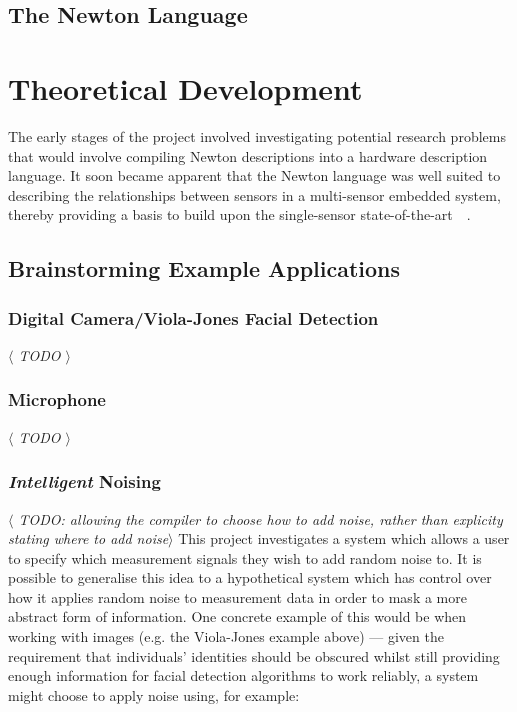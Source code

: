 \documentclass[12pt]{article}
\begin{document}
  \subsection{The Newton Language}


\newpage



%
%

\section{Theoretical Development}
  The early stages of the project involved investigating potential research problems that would involve compiling Newton descriptions into a hardware description language. It soon became apparent that the Newton language was well suited to describing the relationships between sensors in a multi-sensor embedded system, thereby providing a basis to build upon the single-sensor state-of-the-art~\cite{Choi2018GuaranteeingLD}~\cite{diffpriv_2006}.
  \subsection{Brainstorming Example Applications}
    \subsubsection{Digital Camera/Viola-Jones Facial Detection}
      \textit{$\langle$ TODO $\rangle$}

    \subsubsection{Microphone}
      \textit{$\langle$ TODO $\rangle$}

    \subsubsection{\textit{Intelligent} Noising}
      \textit{$\langle$ TODO: allowing the compiler to choose how to add noise, rather than explicity stating where to add noise$\rangle$}
      This project investigates a system which allows a user to specify which measurement signals they wish to add random noise to. It is possible to generalise this idea to a hypothetical system which has control over how it applies random noise to measurement data in order to mask a more abstract form of information. One concrete example of this would be when working with images (e.g. the  Viola-Jones example above) --- given the requirement that individuals' identities should be obscured whilst still providing enough information for facial detection algorithms to work reliably, a system might choose to apply noise using, for example:
\end{document}
